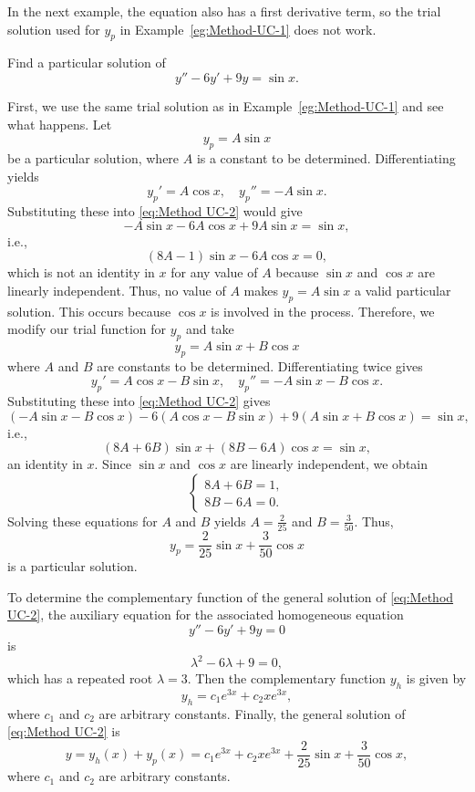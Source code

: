 In the next example, the  equation also has a first derivative term,  so the trial solution  used for $y_p$ in Example~\ref{eg:Method-UC-1} does not work.
\begin{example}\label{eg:Method-UC-2}
	Find a particular solution of 
	\begin{equation}\label{eq:Method UC-2}
	y'' -6y'+ 9y = \sin x.
	\end{equation}
\end{example}
\begin{solution} First, we use the same trial solution  as in Example~\ref{eg:Method-UC-1} and see what happens. Let \[y_p = A\sin x\] be a particular solution, where $A$ is a constant to be determined. Differentiating yields
	\[y_p' = A\cos x, \quad y_p''= -A\sin x.\] Substituting these into \eqref{eq:Method UC-2} would give
	\[-A\sin x-6A\cos x+ 9A\sin x = \sin x,\] i.e.,
	\[ (8A-1)\sin x -6A\cos x = 0,\]  which is not an identity in $x$ for any  value of  $A$ because $\sin x$ and $\cos x$ are linearly independent.  Thus,  no value of $A$ makes  $y_p = A\sin x$ a valid particular solution. This occurs because $\cos x$ is involved in the process.
	  Therefore, we modify our trial function for $y_p$ and take 
	\[ y_p = A\sin x + B\cos x\]  where  $A$ and $B$ are constants to be determined. Differentiating twice gives
	\[y_p' = A\cos x-B\sin x, \quad y_p''= -A\sin x - B\cos x.\] Substituting these into \eqref{eq:Method UC-2}  gives
	\[(-A\sin x - B\cos x)-6(A\cos x-B\sin x)+9(A\sin x + B\cos x) = \sin x,\] i.e.,
	\[(8A+6B) \sin x +(8B-6A)\cos x  =\sin x,\] an identity in $x.$ Since $\sin x$ and $\cos x$ are linearly independent,  we obtain
	\[\begin{cases}
		8A+6B=1,\\
		8B-6A=0.
	\end{cases}\]
	Solving these equations for $A$ and $B$ yields $A = \frac{2}{25}$ and $B= \frac{3}{50}.$ Thus, 
	\[y_p =\frac{2}{25}\sin x+\frac{3}{50}\cos x \] is  a particular solution.
	
	
	To determine the complementary function of the general solution of \eqref{eq:Method UC-2},  the auxiliary equation for the associated homogeneous equation \[y'' -6y'+ 9y =0\]
	is \[\lambda^2 -6\lambda +9 =0,\] which has a repeated root  $\lambda = 3.$  Then the complementary function $y_h$ is given by 
	\[y_h = c_1 e^{3x} + c_2 xe^{3x},\] where $c_1$ and $c_2$ are arbitrary constants. Finally, the general solution of \eqref{eq:Method UC-2} is
	\[y = y_h(x)+y_p(x) = c_1 e^{3x} + c_2 xe^{3x}+\frac{2}{25}\sin x+\frac{3}{50}\cos x,\] where $c_1$ and $c_2$ are arbitrary constants.
\end{solution}


